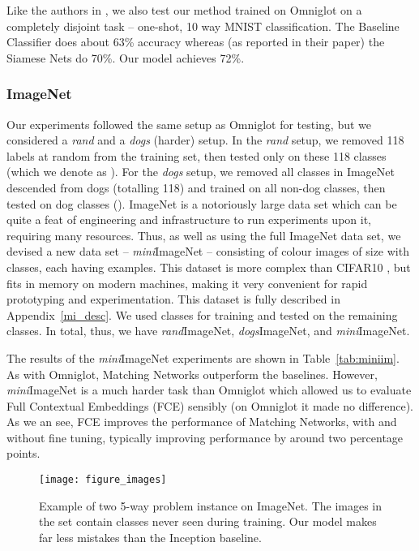 Like the authors in \cite{siamese}, we also test our method trained on Omniglot on a completely disjoint task -- one-shot, 10 way MNIST classification. The Baseline Classifier does about 63\% accuracy whereas (as reported in their paper) the Siamese Nets do 70\%. Our model achieves 72\%.

\subsubsection{ImageNet}
\label{sec:imagenet}

Our experiments followed the same setup as Omniglot for testing, but we considered a \emph{rand} and a \emph{dogs} (harder) setup. In the \emph{rand} setup, we removed 118 labels at random from the training set, then tested only on these 118 classes (which we denote as ). For the \emph{dogs} setup, we removed all classes in ImageNet descended from dogs (totalling 118) and trained on all non-dog classes, then tested on dog classes ().
ImageNet is a notoriously large data set which can be quite a feat of engineering and infrastructure to run experiments upon it, requiring many resources.
Thus, as well as using the full ImageNet data set, we devised a new data set -- \emph{mini}ImageNet -- consisting of  colour images of size  with  classes, each having  examples. This dataset is more complex than CIFAR10 \cite{krizhevsky2010convolutional}, but fits in memory on modern machines, making it very convenient for rapid prototyping and experimentation. This dataset is fully described in Appendix~\ref{mi_desc}.
We used  classes for training and tested on the remaining  classes.
In total, thus, we have \emph{rand}ImageNet, \emph{dogs}ImageNet, and \emph{mini}ImageNet.

The results of the \emph{mini}ImageNet experiments are shown in Table~\ref{tab:miniim}. As with Omniglot, Matching Networks outperform the baselines.
However, \emph{mini}ImageNet is a much harder task than Omniglot which allowed us to evaluate Full Contextual Embeddings (FCE) sensibly (on Omniglot it made no difference).
As we an see, FCE improves the performance of Matching Networks, with and without fine tuning, typically improving performance by around two percentage points. 

\begin{figure}[t]
\centering
\texttt{[image: figure\_images]}
\caption{\label{fig:imgs}Example of two 5-way problem instance on ImageNet. The images in the set  contain classes never seen during training. Our model makes far less mistakes than the Inception baseline. }
\end{figure}

